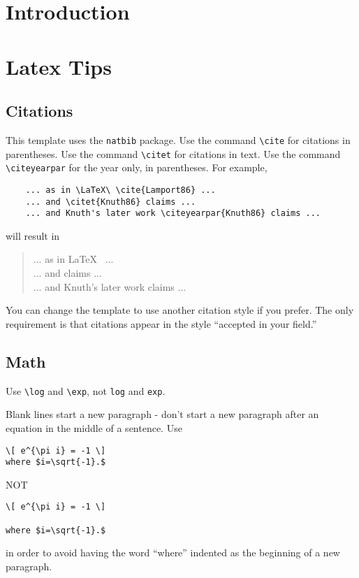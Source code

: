 \documentclass[11pt,leqno]{report}
\begin{document}
\tableofcontents
\listoftables
\listoffigures

\chapter{Introduction}

\chapter{Latex Tips}

\section{Citations}

This template uses the \verb|natbib|
package.
Use the command \verb|\cite| for citations in parentheses.
Use the command \verb|\citet| for citations in text.
Use the command \verb|\citeyearpar| for the year only, in parentheses.
For example,
\begin{verbatim}
    ... as in \LaTeX\ \cite{Lamport86} ...
    ... and \citet{Knuth86} claims ...
    ... and Knuth's later work \citeyearpar{Knuth86} claims ...
\end{verbatim}
will result in
\begin{quote}
... as in \LaTeX\ \cite{Lamport86} ...\\
... and \citet{Knuth86} claims ...\\
... and Knuth's later work \citeyearpar{Knuth86} claims ...
\end{quote}

You can change the template to use another citation style if you prefer.  The only requirement is that citations appear in the style ``accepted in your field.''

\section{Math}

Use \verb|\log| and \verb|\exp|, not \verb|log| and \verb|exp|.

Blank lines start a new paragraph - don't start
a new paragraph after an equation in the middle of a sentence.
Use
\begin{verbatim}
\[ e^{\pi i} = -1 \]
where $i=\sqrt{-1}.$ 
\end{verbatim}
NOT
\begin{verbatim}
\[ e^{\pi i} = -1 \]

where $i=\sqrt{-1}.$ 
\end{verbatim}
in order to avoid having the word ``where'' indented as the
beginning of a new paragraph.
\end{document}
